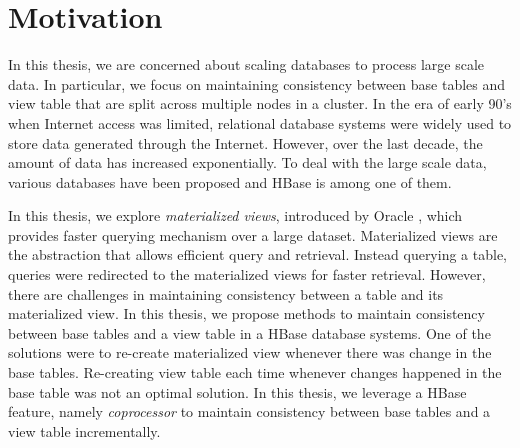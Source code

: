 \documentclass[11pt,a4paper,bibtotoc,idxtotoc,headsepline,footsepline,footexclude,BCOR12mm,DIV13]{scrbook}
\begin{document}

\section{Motivation}
\label{Motivation}


In this thesis, we are concerned about scaling databases to process large scale data. In particular, we focus on maintaining consistency between base tables and view table that are split across multiple nodes in a cluster. In the era of early 90's when Internet access was limited, relational database systems were widely used to store data generated through the Internet. However, over the last decade, the amount of data has increased exponentially. To deal with the large scale data, various databases have been proposed and HBase is among one of them.

In this thesis, we explore \emph{materialized views}, introduced by Oracle \cite{bello1998materialized}, which provides faster querying mechanism over a large dataset. Materialized views  are the abstraction that allows efficient 
query and retrieval. Instead querying a table, queries were redirected to the materialized views for faster retrieval. However, there are challenges in maintaining consistency between a table and its materialized view. In this thesis, we propose methods to maintain consistency between base tables and a view table in a HBase database systems. One of the solutions were to re-create materialized view whenever there was change in the base tables. Re-creating view table each time whenever changes happened in the base table was not an optimal solution. In this thesis, we leverage a HBase feature, namely \emph{coprocessor} to maintain consistency between base tables and a view table incrementally. 
\end{document}
